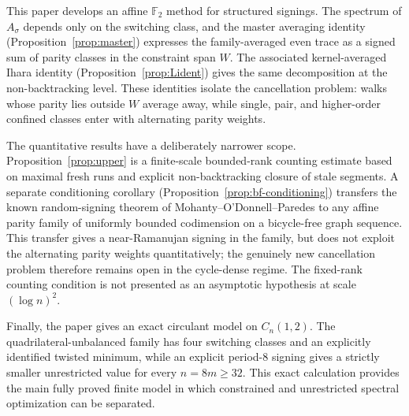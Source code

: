 \documentclass[11pt]{article}
\theoremstyle{remark}
\begin{document}
This paper develops an affine $\mathbb F_2$ method for structured signings. The spectrum of
$A_\sigma$ depends only on the switching class, and the master averaging identity
(Proposition~\ref{prop:master}) expresses the family-averaged even trace as a signed sum
of parity classes in the constraint span $W$. The associated kernel-averaged Ihara identity
(Proposition~\ref{prop:Lident}) gives the same decomposition at the non-backtracking
level. These identities isolate the cancellation problem: walks whose parity lies outside
$W$ average away, while single, pair, and higher-order confined classes enter with alternating
parity weights.

The quantitative results have a deliberately narrower scope. Proposition~\ref{prop:upper}
is a finite-scale bounded-rank counting estimate based on maximal fresh runs and explicit
non-backtracking closure of stale segments. A separate conditioning corollary
(Proposition~\ref{prop:bf-conditioning}) transfers the known random-signing theorem of
Mohanty--O'Donnell--Paredes to any affine parity family of uniformly bounded codimension
on a bicycle-free graph sequence. This transfer gives a near-Ramanujan signing in the
family, but does not exploit the alternating parity weights quantitatively; the genuinely
new cancellation problem therefore remains open in the cycle-dense regime. The fixed-rank
counting condition is not presented as an asymptotic hypothesis at scale $(\log n)^2$.

Finally, the paper gives an exact circulant model on $C_n(1,2)$. The quadrilateral-unbalanced
family has four switching classes and an explicitly identified twisted minimum, while an
explicit period-$8$ signing gives a strictly smaller unrestricted value for every
$n=8m\ge32$. This exact calculation provides the main fully proved finite model in which
constrained and unrestricted spectral optimization can be separated.
\end{document}
